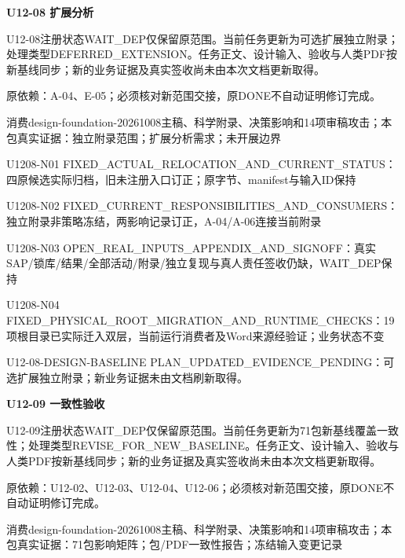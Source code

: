 \documentclass[11pt,a4paper]{article}
\newcommand{\reviewsection}[1]{\par\Needspace{5\baselineskip}\vspace{10pt}\begin{center}{\titlelatin\titlecjk\bfseries\fontsize{14}{20}\selectfont #1}\end{center}}
\begin{document}
\reviewsection{U12-\allowbreak{}08 扩展分析}
U12-\allowbreak{}08注册状态WAIT\_\allowbreak{}DEP仅保留原范围。当前任务更新为可选扩展独立附录；处理类型DEFERRED\_\allowbreak{}EXTENSION。任务正文、设计输入、验收与人类PDF按新基线同步；新的业务证据及真实签收尚未由本次文档更新取得。


原依赖：A-\allowbreak{}04、E-\allowbreak{}05；必须核对新范围交接，原DONE不自动证明修订完成。


消费design-\allowbreak{}foundation-\allowbreak{}20261008主稿、科学附录、决策影响和14项审稿攻击；本包真实证据：独立附录范围；扩展分析需求；未开展边界


U1208-\allowbreak{}N01 FIXED\_\allowbreak{}ACTUAL\_\allowbreak{}RELOCATION\_\allowbreak{}AND\_\allowbreak{}CURRENT\_\allowbreak{}STATUS：四原候选实际归档，旧未注册入口订正；原字节、manifest与输入ID保持


U1208-\allowbreak{}N02 FIXED\_\allowbreak{}CURRENT\_\allowbreak{}RESPONSIBILITIES\_\allowbreak{}AND\_\allowbreak{}CONSUMERS：独立附录非策略冻结，两影响记录订正，A-\allowbreak{}04/\allowbreak{}A-\allowbreak{}06连接当前附录


U1208-\allowbreak{}N03 OPEN\_\allowbreak{}REAL\_\allowbreak{}INPUTS\_\allowbreak{}APPENDIX\_\allowbreak{}AND\_\allowbreak{}SIGNOFF：真实SAP/\allowbreak{}锁库/\allowbreak{}结果/\allowbreak{}全部活动/\allowbreak{}附录/\allowbreak{}独立复现与真人责任签收仍缺，WAIT\_\allowbreak{}DEP保持


U1208-\allowbreak{}N04 FIXED\_\allowbreak{}PHYSICAL\_\allowbreak{}ROOT\_\allowbreak{}MIGRATION\_\allowbreak{}AND\_\allowbreak{}RUNTIME\_\allowbreak{}CHECKS：19项根目录已实际迁入双层，当前运行消费者及Word来源经验证；业务状态不变


U12-\allowbreak{}08-\allowbreak{}DESIGN-\allowbreak{}BASELINE PLAN\_\allowbreak{}UPDATED\_\allowbreak{}EVIDENCE\_\allowbreak{}PENDING：可选扩展独立附录；新业务证据未由文档刷新取得。


\reviewsection{U12-\allowbreak{}09 一致性验收}
U12-\allowbreak{}09注册状态WAIT\_\allowbreak{}DEP仅保留原范围。当前任务更新为71包新基线覆盖一致性；处理类型REVISE\_\allowbreak{}FOR\_\allowbreak{}NEW\_\allowbreak{}BASELINE。任务正文、设计输入、验收与人类PDF按新基线同步；新的业务证据及真实签收尚未由本次文档更新取得。


原依赖：U12-\allowbreak{}02、U12-\allowbreak{}03、U12-\allowbreak{}04、U12-\allowbreak{}06；必须核对新范围交接，原DONE不自动证明修订完成。


消费design-\allowbreak{}foundation-\allowbreak{}20261008主稿、科学附录、决策影响和14项审稿攻击；本包真实证据：71包影响矩阵；包/\allowbreak{}PDF一致性报告；冻结输入变更记录
\end{document}
